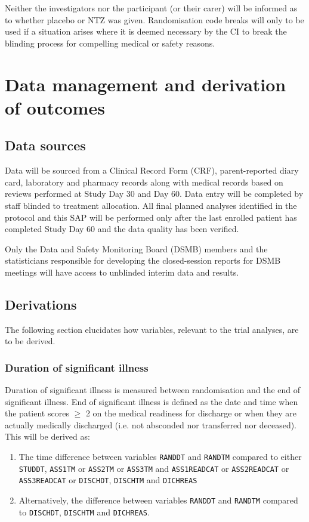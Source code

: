 \documentclass[a4paper]{article}
\begin{document}
Neither the investigators nor the participant (or their carer) will be informed as to whether placebo or NTZ was given.
Randomisation code breaks will only to be used if a situation arises where it is deemed necessary by the CI to break the blinding process for compelling medical or safety reasons. 

\section{Data management and derivation of outcomes}

\subsection{Data sources}

Data will be sourced from a Clinical Record Form (CRF), parent-reported diary card, laboratory and pharmacy records along with medical records based on reviews performed at Study Day 30 and Day 60.
Data entry will be completed by staff blinded to treatment allocation.
All final planned analyses identified in the protocol and this SAP will be performed only after the last enrolled patient has completed Study Day 60 and the data quality has been verified.

Only the Data and Safety Monitoring Board (DSMB) members and the statisticians responsible for developing the  closed-session reports for DSMB meetings will have access to unblinded interim data and results.

\subsection{Derivations}

The following section elucidates how variables, relevant to the trial analyses, are to be derived.

\subsubsection{Duration of significant illness}

Duration of significant illness is measured between randomisation and the end of significant illness.
End of significant illness is defined as the date and time when the patient scores $\ge$ 2 on the medical readiness for discharge or when they are actually medically discharged (i.e. not absconded nor transferred nor deceased).
This will be derived as:

\begin{enumerate}
    \item The time difference between variables \texttt{RANDDT} and \texttt{RANDTM} compared to either \texttt{STUDDT}, \texttt{ASS1TM} or \texttt{ASS2TM} or \texttt{ASS3TM} and \texttt{ASS1READCAT} or \texttt{ASS2READCAT} or \texttt{ASS3READCAT} or \texttt{DISCHDT}, \texttt{DISCHTM} and \texttt{DICHREAS}
    \item Alternatively, the difference between variables \texttt{RANDDT} and \texttt{RANDTM} compared to \texttt{DISCHDT}, \texttt{DISCHTM} and \texttt{DICHREAS}.
\end{enumerate}
\end{document}
